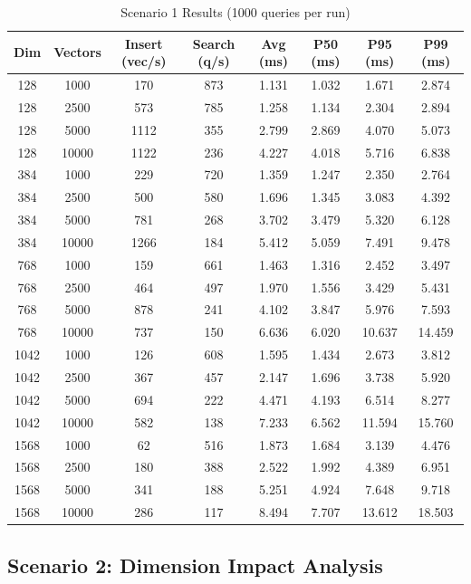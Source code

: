 \documentclass[conference]{IEEEtran}
\begin{document}
\begin{table}[!t]
\centering
\caption{Scenario 1 Results (1000 queries per run)}
\label{tab:scenario1}
\begin{tabular}{@{}cccccccc@{}}
\toprule
\textbf{Dim} & \textbf{Vectors} & \textbf{Insert (vec/s)} & \textbf{Search (q/s)} & \textbf{Avg (ms)} & \textbf{P50 (ms)} & \textbf{P95 (ms)} & \textbf{P99 (ms)} \\
\midrule
128 & 1000  & 170 & 873 & 1.131 & 1.032 & 1.671 & 2.874 \\
128 & 2500  & 573 & 785 & 1.258 & 1.134 & 2.304 & 2.894 \\
128 & 5000  & 1112 & 355 & 2.799 & 2.869 & 4.070 & 5.073 \\
128 & 10000 & 1122 & 236 & 4.227 & 4.018 & 5.716 & 6.838 \\
384 & 1000  & 229 & 720 & 1.359 & 1.247 & 2.350 & 2.764 \\
384 & 2500  & 500 & 580 & 1.696 & 1.345 & 3.083 & 4.392 \\
384 & 5000  & 781 & 268 & 3.702 & 3.479 & 5.320 & 6.128 \\
384 & 10000 & 1266 & 184 & 5.412 & 5.059 & 7.491 & 9.478 \\
768 & 1000  & 159 & 661 & 1.463 & 1.316 & 2.452 & 3.497 \\
768 & 2500  & 464 & 497 & 1.970 & 1.556 & 3.429 & 5.431 \\
768 & 5000  & 878 & 241 & 4.102 & 3.847 & 5.976 & 7.593 \\
768 & 10000 & 737 & 150 & 6.636 & 6.020 & 10.637 & 14.459 \\
1042 & 1000  & 126 & 608 & 1.595 & 1.434 & 2.673 & 3.812 \\
1042 & 2500  & 367 & 457 & 2.147 & 1.696 & 3.738 & 5.920 \\
1042 & 5000  & 694 & 222 & 4.471 & 4.193 & 6.514 & 8.277 \\
1042 & 10000 & 582 & 138 & 7.233 & 6.562 & 11.594 & 15.760 \\
1568 & 1000  & 62 & 516 & 1.873 & 1.684 & 3.139 & 4.476 \\
1568 & 2500  & 180 & 388 & 2.522 & 1.992 & 4.389 & 6.951 \\
1568 & 5000  & 341 & 188 & 5.251 & 4.924 & 7.648 & 9.718 \\
1568 & 10000 & 286 & 117 & 8.494 & 7.707 & 13.612 & 18.503 \\
\bottomrule
\end{tabular}
\end{table}

\subsection{Scenario 2: Dimension Impact Analysis}
\end{document}
